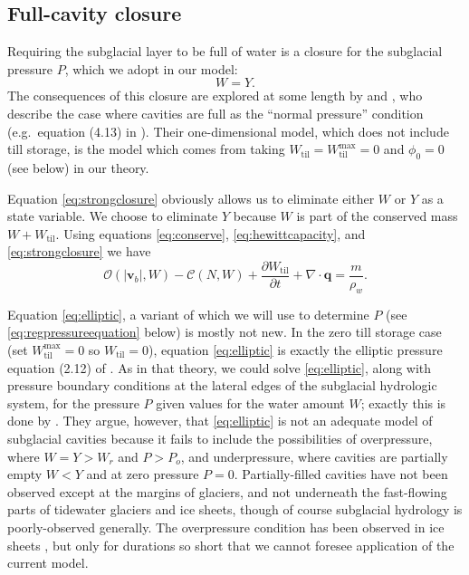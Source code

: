 \documentclass[11pt,final]{amsart}
\newcommand\bv{\mathbf{v}}
\newcommand\bq{\mathbf{q}}
\newcommand{\ddt}[1]{\ensuremath{\frac{\partial #1}{\partial t}}}
\newcommand{\Div}{\nabla\cdot}
\newcommand{\Wtil}{W_{\text{til}}}
\newcommand{\Wtilmax}{W_{\text{til}}^{\text{max}}}
\begin{document}
\subsection*{Full-cavity closure}  Requiring the subglacial layer to be full of water is a closure for the subglacial pressure $P$, which we adopt in our model:
\begin{equation}
W = Y.\label{eq:strongclosure}
\end{equation}
The consequences of this closure are explored at some length by \cite{Schoofetal2012} and \cite{Hewittetal2012}, who describe the case where cavities are full as the ``normal pressure'' condition (e.g.~equation (4.13) in \cite{Schoofetal2012}).  Their one-dimensional model, which does not include till storage, is the model which comes from taking $\Wtil=\Wtilmax=0$ and $\phi_0=0$ (see below) in our theory.

Equation \eqref{eq:strongclosure} obviously allows us to eliminate either $W$ or $Y$ as a state variable.  We choose to eliminate $Y$ because $W$ is part of the conserved mass $W + \Wtil$.  Using equations \eqref{eq:conserve}, \eqref{eq:hewittcapacity}, and \eqref{eq:strongclosure} we have
\begin{equation}
\mathcal{O}(|\bv_b|,W) - \mathcal{C}(N,W) + \ddt{\Wtil} + \Div\bq = \frac{m}{\rho_w}. \label{eq:elliptic}
\end{equation}

Equation \eqref{eq:elliptic}, a variant of which we will use to determine $P$ (see \eqref{eq:regpressureequation} below) is mostly not new.  In the zero till storage case (set $\Wtilmax=0$ so $\Wtil=0$), equation \eqref{eq:elliptic} is exactly the elliptic pressure equation (2.12) of \cite{Schoofetal2012}.  As in that theory, we could solve \eqref{eq:elliptic}, along with pressure boundary conditions at the lateral edges of the subglacial hydrologic system, for the pressure $P$ given values for the water amount $W$; exactly this is done by \cite{Schoofetal2012}.  They argue, however, that \eqref{eq:elliptic} is not an adequate model of subglacial cavities because it fails to include the possibilities of overpressure, where $W=Y>W_r$ and $P>P_o$, and underpressure, where cavities are partially empty $W<Y$ and at zero pressure $P=0$.  Partially-filled cavities have not been observed except at the margins of glaciers, and not underneath the fast-flowing parts of tidewater glaciers and ice sheets, though of course subglacial hydrology is poorly-observed generally.  The overpressure condition has been observed in ice sheets \citep[for example]{Dasetal08}, but only for durations so short that we cannot foresee application of the current model.
\end{document}
